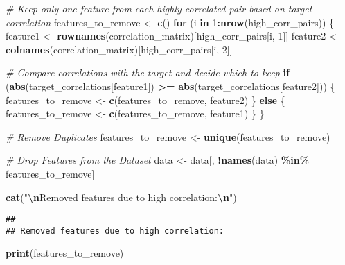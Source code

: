 \documentclass[
]{article}
\newenvironment{Shaded}{\begin{snugshade}}{\end{snugshade}}
\newcommand{\CommentTok}[1]{\textcolor[rgb]{0.56,0.35,0.01}{\textit{#1}}}
\newcommand{\ControlFlowTok}[1]{\textcolor[rgb]{0.13,0.29,0.53}{\textbf{#1}}}
\newcommand{\DecValTok}[1]{\textcolor[rgb]{0.00,0.00,0.81}{#1}}
\newcommand{\FunctionTok}[1]{\textcolor[rgb]{0.13,0.29,0.53}{\textbf{#1}}}
\newcommand{\NormalTok}[1]{#1}
\newcommand{\OtherTok}[1]{\textcolor[rgb]{0.56,0.35,0.01}{#1}}
\newcommand{\SpecialCharTok}[1]{\textcolor[rgb]{0.81,0.36,0.00}{\textbf{#1}}}
\newcommand{\StringTok}[1]{\textcolor[rgb]{0.31,0.60,0.02}{#1}}
\begin{document}
\begin{Shaded}
\begin{Highlighting}[]
\CommentTok{\# Keep only one feature from each highly correlated pair based on target correlation}
\NormalTok{features\_to\_remove }\OtherTok{\textless{}{-}} \FunctionTok{c}\NormalTok{()}
\ControlFlowTok{for}\NormalTok{ (i }\ControlFlowTok{in} \DecValTok{1}\SpecialCharTok{:}\FunctionTok{nrow}\NormalTok{(high\_corr\_pairs)) \{}
\NormalTok{  feature1 }\OtherTok{\textless{}{-}} \FunctionTok{rownames}\NormalTok{(correlation\_matrix)[high\_corr\_pairs[i, }\DecValTok{1}\NormalTok{]]}
\NormalTok{  feature2 }\OtherTok{\textless{}{-}} \FunctionTok{colnames}\NormalTok{(correlation\_matrix)[high\_corr\_pairs[i, }\DecValTok{2}\NormalTok{]]}
  
  \CommentTok{\# Compare correlations with the target and decide which to keep}
  \ControlFlowTok{if}\NormalTok{ (}\FunctionTok{abs}\NormalTok{(target\_correlations[feature1]) }\SpecialCharTok{\textgreater{}=} \FunctionTok{abs}\NormalTok{(target\_correlations[feature2])) \{}
\NormalTok{    features\_to\_remove }\OtherTok{\textless{}{-}} \FunctionTok{c}\NormalTok{(features\_to\_remove, feature2)}
\NormalTok{  \} }\ControlFlowTok{else}\NormalTok{ \{}
\NormalTok{    features\_to\_remove }\OtherTok{\textless{}{-}} \FunctionTok{c}\NormalTok{(features\_to\_remove, feature1)}
\NormalTok{  \}}
\NormalTok{\}}

\CommentTok{\# Remove Duplicates}
\NormalTok{features\_to\_remove }\OtherTok{\textless{}{-}} \FunctionTok{unique}\NormalTok{(features\_to\_remove)}

\CommentTok{\# Drop Features from the Dataset}
\NormalTok{data }\OtherTok{\textless{}{-}}\NormalTok{ data[, }\SpecialCharTok{!}\FunctionTok{names}\NormalTok{(data) }\SpecialCharTok{\%in\%}\NormalTok{ features\_to\_remove]}

\FunctionTok{cat}\NormalTok{(}\StringTok{"}\SpecialCharTok{\textbackslash{}n}\StringTok{Removed features due to high correlation:}\SpecialCharTok{\textbackslash{}n}\StringTok{"}\NormalTok{)}
\end{Highlighting}
\end{Shaded}

\begin{verbatim}
## 
## Removed features due to high correlation:
\end{verbatim}

\begin{Shaded}
\begin{Highlighting}[]
\FunctionTok{print}\NormalTok{(features\_to\_remove)}
\end{Highlighting}
\end{Shaded}
\end{document}
